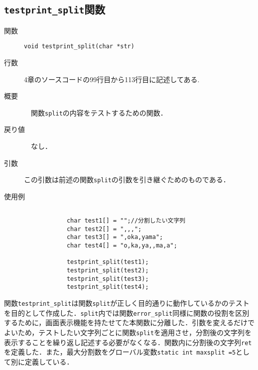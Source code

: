 \documentclass[a4j,11pt]{jarticle}
\begin{document}
\subsection{\texttt{testprint\_split}関数}
 \begin{description}
    \item[関数] \verb|void testprint_split(char *str)|
    \item[行数]  4章のソースコードの99行目から113行目に記述してある. 
    \item[概要]　関数\verb|split|の内容をテストするための関数．
    \item[戻り値]　なし．
    \item[引数]  この引数は前述の関数\verb|split|の引数を引き継ぐためのものである．
    \item[使用例]
      \begin{verbatim}

    	    char test1[] = "";//分割したい文字列
    	    char test2[] = ",,,";
    	    char test3[] = ",oka,yama";
    	    char test4[] = "o,ka,ya,,ma,a";
    	    
    	    testprint_split(test1);
    	    testprint_split(test2);
    	    testprint_split(test3);
    	    testprint_split(test4);
      \end{verbatim}
\end{description}
関数\verb|testprint_split|は関数\verb|split|が正しく目的通りに動作しているかのテストを目的として作成した．\verb|split|内では関数\verb|error_split|同様に関数の役割を区別するために，画面表示機能を持たせてた本関数に分離した．引数を変えるだけでよいため，テストしたい文字列ごとに関数\verb|split|を適用させ，分割後の文字列を表示することを繰り返し記述する必要がなくなる．関数内に分割後の文字列\verb|ret|を定義した．また，最大分割数をグローバル変数\verb|static int maxsplit =5|として別に定義している．
\end{document}
